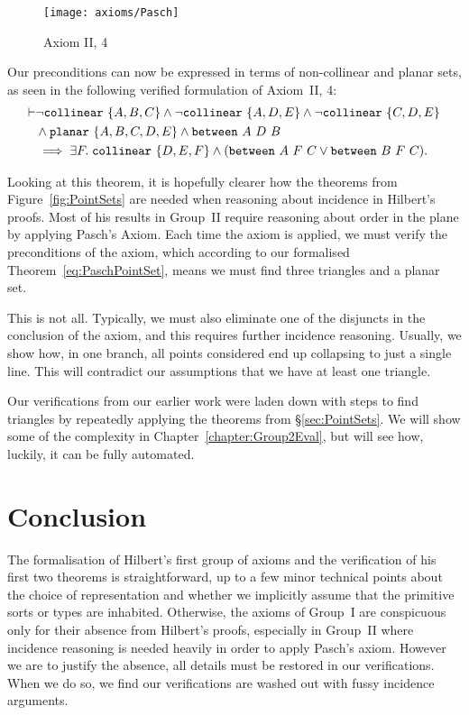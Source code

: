 \begin{figure}
\centering\texttt{[image: axioms/Pasch]}
\caption{Axiom II, 4}
\label{fig:PaschDiagram}
\end{figure}

Our preconditions can now be expressed in terms of non-collinear and planar sets, as seen in the following verified formulation of Axiom~II, 4:%
\begin{equation}\label{eq:PaschPointSet}
\begin{aligned}
  \vdash&\neg\code{collinear}\ \{A,B,C\}\wedge\neg\code{collinear}\ \{A,D,E\}\wedge\neg\code{collinear}\ \{C,D,E\}\\
  &\wedge\code{planar}\ \{A,B,C,D,E\}\wedge\between{A}{D}{B}\\
  &\implies\exists F.\; \code{collinear}\ \{D,E,F\} \wedge (\between{A}{F}{C}\vee\between{B}{F}{C}).
\end{aligned}
\end{equation}

Looking at this theorem, it is hopefully clearer how the theorems from Figure~\ref{fig:PointSets} are needed when reasoning about incidence in Hilbert's proofs. Most of his results in Group~II require reasoning about order in the plane by applying Pasch's Axiom. Each time the axiom is applied, we must verify the preconditions of the axiom, which according to our formalised Theorem~\ref{eq:PaschPointSet}, means we must find three triangles and a planar set.

This is not all. Typically, we must also eliminate one of the disjuncts in the conclusion of the axiom, and this requires further incidence reasoning. Usually, we show how, in one branch, all points considered end up collapsing to just a single line. This will contradict our assumptions that we have at least one triangle.

Our verifications from our earlier work were laden down with steps to find triangles by repeatedly applying the theorems from \S\ref{sec:PointSets}. We will show some of the complexity in Chapter~\ref{chapter:Group2Eval}, but will see how, luckily, it can be fully automated.

\section{Conclusion}
The formalisation of Hilbert's first group of axioms and the verification of his first two theorems is straightforward, up to a few minor technical points about the choice of representation and whether we implicitly assume that the primitive sorts or types are inhabited. Otherwise, the axioms of Group~I are conspicuous only for their absence from Hilbert's proofs, especially in Group~II where incidence reasoning is needed heavily in order to apply Pasch's axiom. However we are to justify the absence, all details must be restored in our verifications. When we do so, we find our verifications are washed out with fussy incidence arguments.

